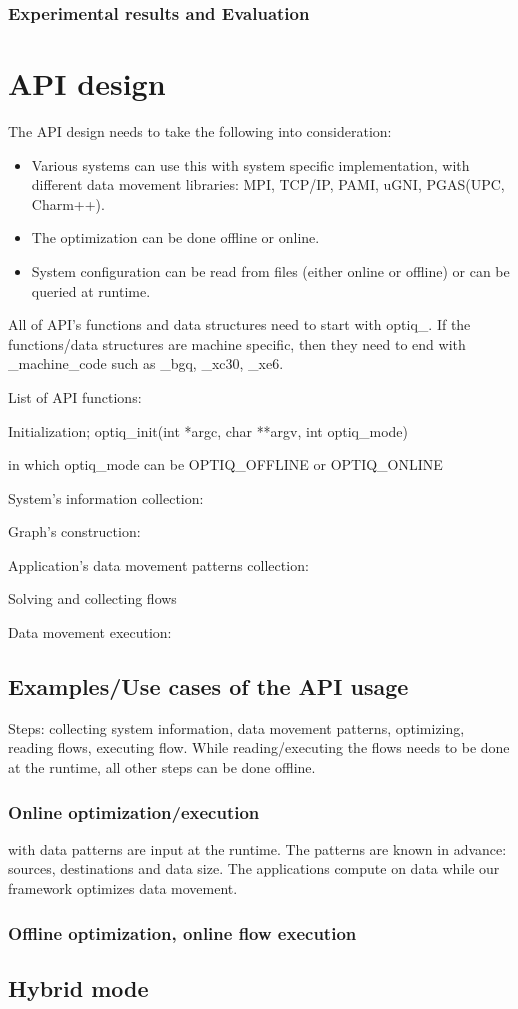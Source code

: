 \documentclass[letter]{article}
\begin{document}
\subsubsection{Experimental results and Evaluation}

\section{API design}
The API design needs to take the following into consideration:

\begin{itemize}
	\item Various systems can use this with system specific implementation, with different data movement libraries: MPI, TCP/IP, PAMI, uGNI, PGAS(UPC, Charm++).
	\item The optimization can be done offline or online.
	\item System configuration can be read from files (either online or offline) or can be queried at runtime.
\end{itemize}

All of API's functions and data structures need to start with optiq\_. If the functions/data structures are machine specific, then they need to end with \_machine\_code such as \_bgq, \_xc30, \_xe6.

List of API functions:

Initialization;
optiq\_init(int *argc, char **argv, int optiq\_mode)

in which optiq\_mode can be OPTIQ\_OFFLINE or OPTIQ\_ONLINE

System's information collection:



Graph's construction:

Application's data movement patterns collection:

Solving and collecting flows

Data movement execution:


\subsection{Examples/Use cases of the API usage}

Steps: collecting system information, data movement patterns, optimizing, reading flows, executing flow. While reading/executing the flows needs to be done at the runtime, all other steps can be done offline.

\subsubsection{Online optimization/execution} with data patterns are input at the runtime. The patterns are known in advance: sources, destinations and data size. The applications compute on data while our framework optimizes data movement.



\subsubsection{Offline optimization, online flow execution}

\subsection{Hybrid mode}
\end{document}
